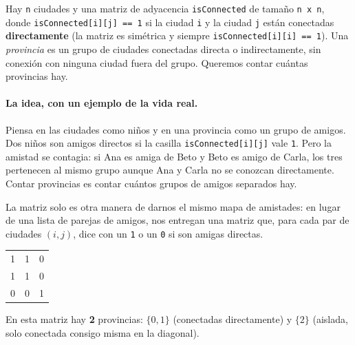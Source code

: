 
Hay \texttt{n} ciudades y una matriz de adyacencia \texttt{isConnected} de
tamaño \texttt{n x n}, donde \texttt{isConnected[i][j] == 1} si la ciudad
\texttt{i} y la ciudad \texttt{j} están conectadas \textbf{directamente}
(la matriz es simétrica y siempre \texttt{isConnected[i][i] == 1}). Una
\emph{provincia} es un grupo de ciudades conectadas directa o
indirectamente, sin conexión con ninguna ciudad fuera del grupo. Queremos
contar cuántas provincias hay.

\paragraph{La idea, con un ejemplo de la vida real.} Piensa en las ciudades
como niños y en una provincia como un grupo de amigos. Dos niños son amigos
directos si la casilla \texttt{isConnected[i][j]} vale \texttt{1}. Pero la
amistad se contagia: si Ana es amiga de Beto y Beto es amigo de Carla, los
tres pertenecen al mismo grupo aunque Ana y Carla no se conozcan
directamente. Contar provincias es contar cuántos grupos de amigos separados
hay.

La matriz solo es otra manera de darnos el mismo mapa de amistades: en lugar
de una lista de parejas de amigos, nos entregan una matriz que, para cada
par de ciudades $(i,j)$, dice con un \texttt{1} o un \texttt{0} si son amigas
directas.

\begin{center}
\ttfamily
\begin{tabular}{ccc}
1 & 1 & 0\\
1 & 1 & 0\\
0 & 0 & 1\\
\end{tabular}
\end{center}

\noindent En esta matriz hay \textbf{2} provincias: $\{0, 1\}$ (conectadas
directamente) y $\{2\}$ (aislada, solo conectada consigo misma en la
diagonal).

